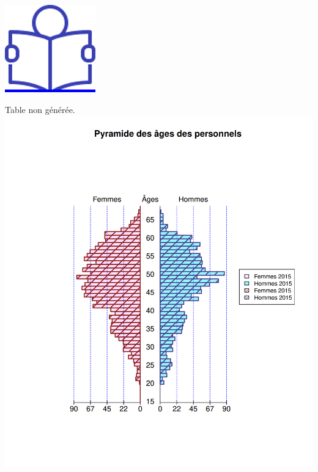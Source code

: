 \href{../Docs/Notices/fiche_2.odt}{\includegraphics{icones/Notice.png}}

Table non
générée.\includegraphics{altair_files/figure-latex/unnamed-chunk-11-1.png}
